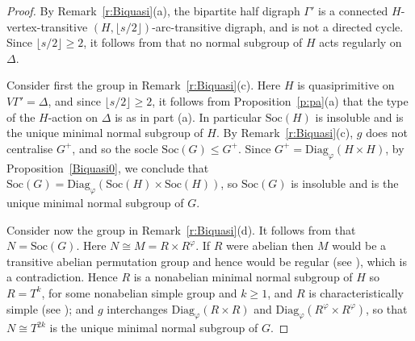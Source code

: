 \documentclass[11pt]{amsart}
\newcommand{\Soc}{\mathrm{Soc}}
\newcommand{\Diag}{\mathrm{Diag}}
\begin{document}
\begin{proof}
    By Remark~\ref{r:Biquasi}(a), the bipartite half digraph $\Gamma'$ is a connected $H$-vertex-transitive \((H,\lfloor s/2\rfloor )\)-arc-transitive digraph, and is not a directed cycle. Since $\lfloor s/2\rfloor \geqslant2$, it follows from \cite[Theorem 3.1]{Praeger} that no normal subgroup of $H$ acts regularly on $\Delta$. 


    Consider first the group in Remark~\ref{r:Biquasi}(c). Here $H$ is quasiprimitive on $V\Gamma'=\Delta$, and since $\lfloor s/2\rfloor \geqslant2$, it follows from Proposition~\ref{p:pa}(a) that the type of the $H$-action on $\Delta$ is as in part (a).  In particular $\Soc(H)$ is insoluble and is the unique minimal normal subgroup of $H$. By Remark~\ref{r:Biquasi}(c), $g$ does not centralise $G^+$, and so the socle $\Soc(G)\leqslant G^+$. Since $G^+=\Diag_\varphi(H\times H)$, by Proposition~\ref{Biquasi0}, we conclude that $\Soc(G)=\Diag_\varphi(\Soc(H)\times \Soc(H))$, so $\Soc(G)$ is insoluble and is the unique minimal normal subgroup of $G$. 
    
    


    
    Consider now the group in Remark~\ref{r:Biquasi}(d). It follows from  \cite[Theorem 1.1 (c)]{Praeger03} that $N=\Soc(G)$. Here $N\cong M=R\times R^\varphi$. If $R$ were abelian then $M$ would be a transitive abelian permutation group and hence would be regular (see \cite[Theorem 3.2]{csaba}), which is a contradiction. Hence $R$ is a nonabelian minimal normal subgroup of $H$ so $R=T^k$, for some nonabelian simple group and $k\geqslant1$, and $R$  is characteristically simple (see \cite[Lemma 3.14]{csaba}); and $g$ interchanges $\Diag_\varphi(R\times R)$ and  $\Diag_\varphi(R^\varphi\times R^\varphi)$, so that $N\cong T^{2k}$ is the unique minimal normal subgroup of $G$.      
    \end{proof}
\end{document}
